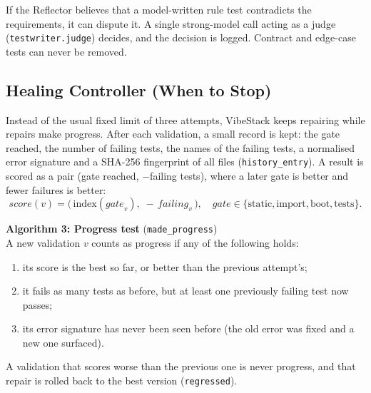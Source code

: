 \documentclass[12pt,a4paper]{report}
\begin{document}
If the Reflector believes that a model-written rule test contradicts the requirements, it can dispute it. A single strong-model call acting as a judge (\texttt{testwriter.judge}) decides, and the decision is logged. Contract and edge-case tests can never be removed.

\subsection{Healing Controller (When to Stop)}

Instead of the usual fixed limit of three attempts, VibeStack keeps repairing while repairs make progress. After each validation, a small record is kept: the gate reached, the number of failing tests, the names of the failing tests, a normalised error signature and a SHA-256 fingerprint of all files (\texttt{history\_entry}). A result is scored as a pair (gate reached, $-$failing tests), where a later gate is better and fewer failures is better:
\[
\mathit{score}(v) = \big(\,\mathrm{index}(\mathit{gate}_v),\; -\,\mathit{failing}_v\,\big),
\quad \mathit{gate} \in \{\text{static}, \text{import}, \text{boot}, \text{tests}\}.
\]

\noindent\textbf{Algorithm 3: Progress test} (\texttt{made\_progress})\\
A new validation $v$ counts as progress if any of the following holds:
\begin{enumerate}
    \item its score is the best so far, or better than the previous attempt's;
    \item it fails as many tests as before, but at least one previously failing test now passes;
    \item its error signature has never been seen before (the old error was fixed and a new one surfaced).
\end{enumerate}
A validation that scores worse than the previous one is never progress, and that repair is rolled back to the best version (\texttt{regressed}).
\end{document}
